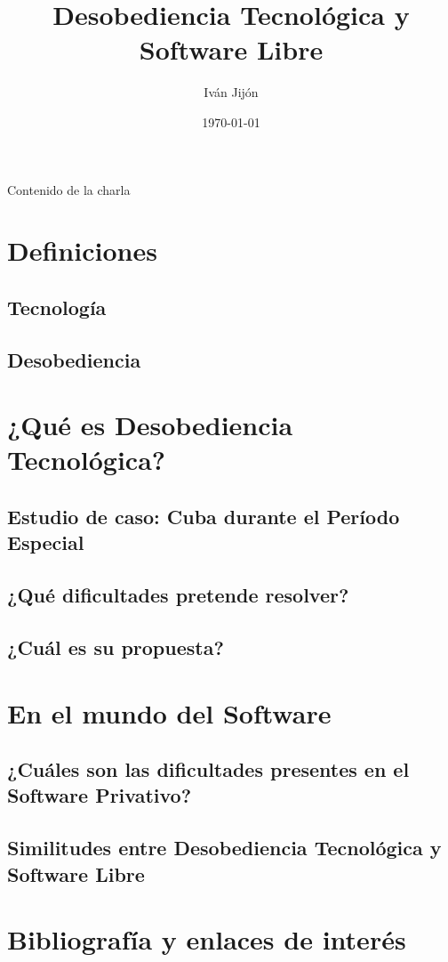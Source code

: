 \documentclass[spanish]{beamer}
\title{Desobediencia Tecnológica y Software Libre}
\author{Iván Jijón}
\institute{ FLISoL 2023, Quito - Ecuador}
\date{\today}
\begin{document}
\begin{frame}
    \titlepage
\end{frame}


\begin{frame}{Contenido de la charla}
    \tableofcontents
\end{frame}

\section{Definiciones}
    \subsection{Tecnología}
    \subsection{Desobediencia}
\section{¿Qué es \bf{Desobediencia Tecnológica}?}
    \subsection{Estudio de caso: Cuba durante el Período Especial}
    \subsection{¿Qué \bf{dificultades} pretende \bf{resolver}?}
    \subsection{¿Cuál es su \bf{propuesta}?}
\section{En el mundo del Software}
    \subsection{¿Cuáles son las dificultades presentes en el \bf{Software Privativo}?}
    \subsection{Similitudes entre \bf{Desobediencia Tecnológica} y \bf{Software Libre}}
\section{Bibliografía y enlaces de interés}
\end{document}

